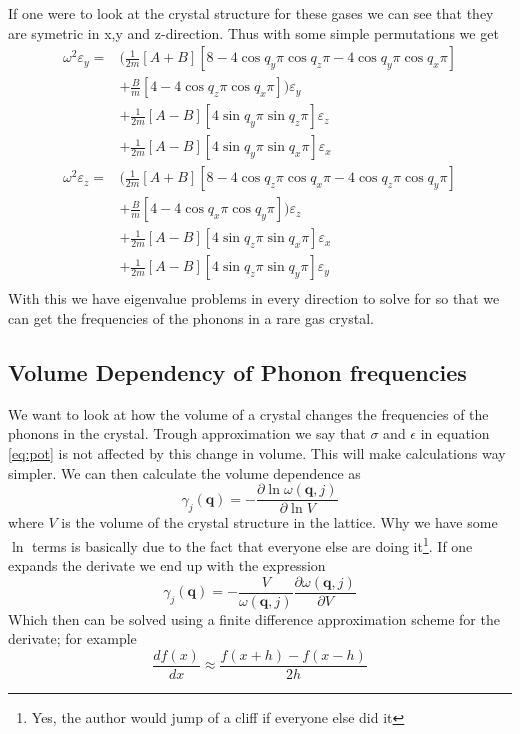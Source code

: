 \documentclass[11pt]{article}
\begin{document}
If one were to look at the crystal structure for these gases we can see that they are symetric in x,y and z-direction. Thus with some simple permutations we get
\begin{align}
	\omega^2\varepsilon_y = &\big( \frac{1}{2m} [A+B][8-4\cos{q_y\pi}\cos{q_z\pi}-4\cos{q_y\pi}\cos{q_x\pi}] \\
	&+ \frac{B}{m}[4-4\cos{q_z\pi}\cos{q_x\pi}]\big)\varepsilon_y \\
	&+\frac{1}{2m}[A-B][4\sin{q_y\pi}\sin{q_z\pi}]\varepsilon_z \\
	&+\frac{1}{2m}[A-B][4\sin{q_y\pi}\sin{q_x\pi}]\varepsilon_x \\
	\omega^2\varepsilon_z = &\big( \frac{1}{2m} [A+B][8-4\cos{q_z\pi}\cos{q_x\pi}-4\cos{q_z\pi}\cos{q_y\pi}] \\
	&+ \frac{B}{m}[4-4\cos{q_x\pi}\cos{q_y\pi}]\big)\varepsilon_z \\
	&+\frac{1}{2m}[A-B][4\sin{q_z\pi}\sin{q_x\pi}]\varepsilon_x \\
	&+\frac{1}{2m}[A-B][4\sin{q_z\pi}\sin{q_y\pi}]\varepsilon_y \\
	\label{eq:omegaRest}
\end{align}
With this we have eigenvalue problems in every direction to solve for so that we can get the frequencies of the phonons in a rare gas crystal.
\subsection{Volume Dependency of Phonon frequencies}
We want to look at how the volume of a crystal changes the frequencies of the phonons in the crystal. Trough approximation we say that $\sigma$ and $\epsilon$ in equation \ref{eq:pot} is not affected by this change in volume. This will make calculations way simpler. We can then calculate the volume dependence as 
\begin{equation}
	\gamma_j(\mathbf{q}) = - \frac{\partial \ln{ \omega(\mathbf{q},j)}}{\partial \ln{V}}
\end{equation}
where $V$ is the volume of the crystal structure in the lattice. Why we have some $\ln$ terms is basically due to the fact that everyone else are doing it\footnote{Yes, the author would jump of a cliff if everyone else did it}. If one expands the derivate we end up with the expression
\begin{equation}
	\gamma_j(\mathbf{q}) =  -\frac{V}{\omega(\mathbf{q},j)} \frac{\partial \omega(\mathbf{q},j)}{\partial V}
	\label{eq:volDep}
\end{equation}
Which then can be solved using a finite difference approximation scheme for the derivate; for example
\begin{equation}
	\frac{df(x)}{dx} \approx \frac{f(x+h)-f(x-h)}{2h}
	\label{eq:derivate}
\end{equation}
\end{document}
